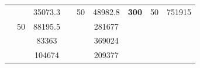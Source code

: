 \begin{table}[]
\begin{tabular}{|cccccclll}
\rowcolor[HTML]{DDFDFF} 
\multicolumn{1}{|c|}{\cellcolor[HTML]{FFFFC7}}                                & \multicolumn{1}{c|}{\cellcolor[HTML]{DDFDFF}}                      & \multicolumn{1}{c|}{\cellcolor[HTML]{DAE8FC}35073.3}   & \multicolumn{1}{c|}{\cellcolor[HTML]{FFFFC7}}                                & \multicolumn{1}{c|}{\multirow{-10}{*}{\cellcolor[HTML]{DDFDFF}50}}  & \multicolumn{1}{c|}{\cellcolor[HTML]{DDFDFF}48982.8}   & \multicolumn{1}{c|}{\multirow{-19}{*}{\cellcolor[HTML]{FFFFC7}\textbf{300}}} & \multicolumn{1}{c|}{\multirow{-10}{*}{\cellcolor[HTML]{DDFDFF}50}} & \multicolumn{1}{c|}{\cellcolor[HTML]{DDFDFF}751915}    \\ \cline{3-3} \cline{5-9} 
\multicolumn{1}{|c|}{\cellcolor[HTML]{FFFFC7}}                                & \multicolumn{1}{c|}{\multirow{-10}{*}{\cellcolor[HTML]{DDFDFF}50}} & \multicolumn{1}{c|}{\cellcolor[HTML]{DDFDFF}88195.5}   & \multicolumn{1}{c|}{\cellcolor[HTML]{FFFFC7}}                                & \multicolumn{1}{c|}{\cellcolor[HTML]{DAE8FC}}                       & \multicolumn{1}{c|}{\cellcolor[HTML]{DAE8FC}281677}    &                                                                              &                                                                    &                                                        \\ \cline{2-3} \cline{6-6}
\multicolumn{1}{|c|}{\cellcolor[HTML]{FFFFC7}}                                & \multicolumn{1}{c|}{\cellcolor[HTML]{DAE8FC}}                      & \multicolumn{1}{c|}{\cellcolor[HTML]{DAE8FC}83363}     & \multicolumn{1}{c|}{\cellcolor[HTML]{FFFFC7}}                                & \multicolumn{1}{c|}{\cellcolor[HTML]{DAE8FC}}                       & \multicolumn{1}{c|}{\cellcolor[HTML]{DDFDFF}369024}    &                                                                              &                                                                    &                                                        \\ \cline{3-3} \cline{6-6}
\multicolumn{1}{|c|}{\cellcolor[HTML]{FFFFC7}}                                & \multicolumn{1}{c|}{\cellcolor[HTML]{DAE8FC}}                      & \multicolumn{1}{c|}{\cellcolor[HTML]{DDFDFF}104674}    & \multicolumn{1}{c|}{\cellcolor[HTML]{FFFFC7}}                                & \multicolumn{1}{c|}{\cellcolor[HTML]{DAE8FC}}                       & \multicolumn{1}{c|}{\cellcolor[HTML]{DAE8FC}209377}    &                                                                              &                                                                    &                                                        \\ \cline{3-3} \cline{6-6}

\end{tabular}
\end{table}
